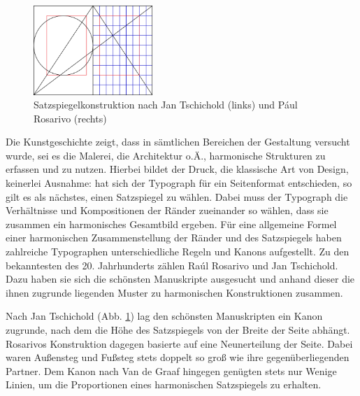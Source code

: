 \documentclass[12pt,a4paper]{article}
\begin{document}

\begin{figure}
\centering
\includegraphics[width=0.4\textwidth]{Bilder/page_construction.png}
\caption{Satzspiegelkonstruktion nach Jan Tschichold (links) und Pául Rosarivo (rechts)\protect\footnotemark[5]}
\label{fig:TschicholdRosarivo}
\end{figure}


Die Kunstgeschichte zeigt, dass in sämtlichen Bereichen der Gestaltung versucht wurde, sei es die Malerei, die Architektur o.Ä., harmonische Strukturen zu erfassen und zu nutzen. Hierbei bildet der Druck, die klassische Art von Design, keinerlei Ausnahme: hat sich der Typograph für ein Seitenformat entschieden, so gilt es als nächstes, einen Satzspiegel zu wählen. Dabei muss der Typograph die Verhältnisse und Kompositionen der Ränder zueinander so wählen, dass sie zusammen ein harmonisches Gesamtbild ergeben. Für eine allgemeine Formel einer harmonischen Zusammenstellung der Ränder und des Satzspiegels haben zahlreiche Typographen unterschiedliche Regeln und Kanons aufgestellt. Zu den bekanntesten des 20. Jahrhunderts zählen Raúl Rosarivo und Jan Tschichold. Dazu haben sie sich die schönsten Manuskripte ausgesucht und anhand dieser die ihnen zugrunde liegenden Muster zu harmonischen Konstruktionen zusammen.

Nach Jan Tschichold (Abb. \ref{fig:TschicholdRosarivo}) lag den schönsten Manuskripten ein Kanon zugrunde, nach dem die Höhe des Satzspiegels von der Breite der Seite abhängt. Rosarivos Konstruktion dagegen basierte auf eine Neunerteilung der Seite. Dabei waren Außensteg und Fußsteg stets doppelt so groß wie ihre gegenüberliegenden Partner. Dem Kanon nach Van de Graaf hingegen genügten stets nur Wenige Linien, um die Proportionen eines harmonischen Satzspiegels zu erhalten.
\end{document}
